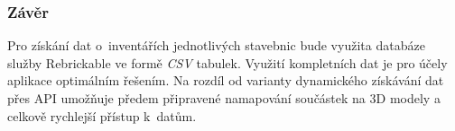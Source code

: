   \subsubsection{Závěr}
  Pro získání dat o~inventářích jednotlivých stavebnic bude využita databáze služby Rebrickable ve formě \textit{\gls{CSV}} tabulek. Využití kompletních dat je pro účely aplikace optimálním řešením. Na rozdíl od varianty dynamického získávání dat přes \gls{API} umožňuje předem připravené namapování součástek na 3D modely a celkově rychlejší přístup k~datům.